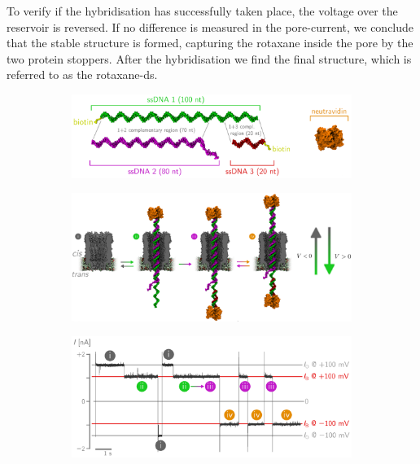 To verify if the hybridisation has successfully taken place, the voltage over the
reservoir is reversed. If no difference is measured in the pore-current, we conclude that
the stable structure is formed, capturing the rotaxane inside the pore by the two protein
stoppers. After the hybridisation we find the final structure, which is referred to as
the rotaxane-ds.

\begin{figure}[h!]
  \begin{centering}
  \begin{subfigure}[t]{\linewidth-1.3em\relax}
  \centering
  \includegraphics[width=\linewidth,valign=t]{Figures/RConstruction1.png}
  \end{subfigure}%
  \vspace{0.2cm}
  \begin{subfigure}[t]{\linewidth-1.3em\relax}
  \centering
  \includegraphics[width=\linewidth,valign=t]{Figures/RConstruction4.png}
  \end{subfigure}%
  \vspace{0.2cm}
  \begin{subfigure}[t]{\linewidth-1.3em\relax}
  \centering
  \includegraphics[width=\linewidth,valign=t]{Figures/RConstruction3.png}

\end{subfigure}
\end{centering}
\end{figure}
